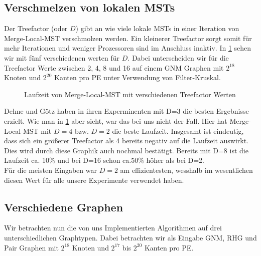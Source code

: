 \subsection{Verschmelzen von lokalen MSTs}\label{eval-treefactor}
Der Treefactor (oder $D$) gibt an wie viele lokale MSTs in einer Iteration von Merge-Local-MST verschmolzen werden. Ein kleinerer Treefactor sorgt somit für mehr Iterationen und weniger Prozessoren sind im Anschluss inaktiv.
In \cref{Treefactor-Img} sehen wir \mergeMST mit fünf verschiedenen werten für $D$.
Dabei unterscheiden wir für die Treefactor Werte zwischen 2, 4, 8 und 16 auf einem GNM Graphen mit $2^{18}$ Knoten und $2^{20}$ Kanten pro PE unter Verwendung von Filter-Kruskal.


\begin{figure}[H]
    \centering
    
    
    
    \caption{Laufzeit von Merge-Local-MST mit verschiedenen Treefactor Werten}
    \label{Treefactor-Img}
\end{figure}


Dehne und Götz \cite{dehne1998practical} haben in ihren Experminenten mit D=3 die besten Ergebnisse erzielt. 
Wie man in \cref{Treefactor-Img} aber sieht, war das bei uns nicht der Fall. Hier hat Merge-Local-MST mit $D=4$ bzw. $D=2$ die beste Laufzeit. 
Insgesamt ist eindeutig, dass sich ein größerer Treefactor als 4 bereits negativ auf die Laufzeit auswirkt. Dies wird durch diese Graphik auch nochmal bestätigt. Bereits mit D=8 ist die Laufzeit ca. 10\% und bei D=16 schon ca.50\% höher als bei D=2.\\
Für die meisten Eingaben war $D=2$ am effizientesten, wesshalb im wesentlichen diesen Wert für alle unsere Experimente verwendet haben.



\subsection{Verschiedene Graphen}
Wir betrachten nun die von uns Implementierten Algorithmen auf drei unterschiedlichen Graphtypen. Dabei betrachten wir als Eingabe GNM, RHG und Pair Graphen mit $2^{18}$ Knoten und $2^{17}$ bis $2^{20}$ Kanten pro PE.


